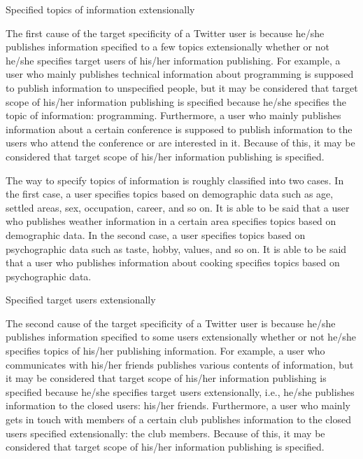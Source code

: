 \begin{description}
\bf {\item[(1)] Specified topics of information extensionally}
\label{item:Topic}
\end{description}

The first cause of the target specificity of a Twitter user is because
he/she publishes information specified to a few topics extensionally
whether or not he/she specifies target users of his/her information
publishing.  For example, a user who mainly publishes technical
information about programming is supposed to publish information to
unspecified people, but it may be considered that target scope of
his/her information publishing is specified because he/she specifies the
topic of information: programming.  Furthermore, a user who mainly
publishes information about a certain conference is supposed to publish
information to the users who attend the conference or are interested in
it.  Because of this, it may be considered that target scope of his/her
information publishing is specified.

The way to specify topics of information is roughly classified into two
cases.  In the first case, a user specifies topics based on demographic
data such as age, settled areas, sex, occupation, career, and so on.  It
is able to be said that a user who publishes weather information in a
certain area specifies topics based on demographic data.  In the second
case, a user specifies topics based on psychographic data such as taste,
hobby, values, and so on.  It is able to be said that a user who
publishes information about cooking specifies topics based on
psychographic data.

\begin{description}
\bf{\item[(2)] Specified target users extensionally}
\label{item:User}
\end{description}

The second cause of the target specificity of a Twitter user is because
he/she publishes information specified to some users extensionally
whether or not he/she specifies topics of his/her publishing
information.  For example, a user who communicates with his/her friends
publishes various contents of information, but it may be considered that
target scope of his/her information publishing is specified because
he/she specifies target users extensionally, i.e., he/she publishes
information to the closed users: his/her friends.  Furthermore, a user
who mainly gets in touch with members of a certain club publishes
information to the closed users specified extensionally: the club
members.  Because of this, it may be considered that target scope of
his/her information publishing is specified.

